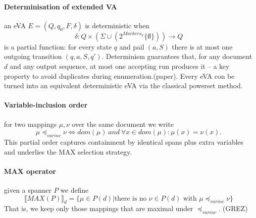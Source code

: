 \paragraph{Determinisation of extended VA} an eVA $E = (Q, q_0, F, \delta)$ is deterministic when
$$
\delta : Q \times (\Sigma \cup (2^{Markers_V}\{\emptyset\}))\rightarrow Q
$$
is a partial function: for every state $q$ and pail $(a,S)$ there is at most one outgoing transition $(q,a,S,q')$. Determinism guarantees that, for any document $d$ and any output sequence, at most one accepting run produces it – a key property to avoid duplicates during enumeration.(paper).
Every eVA con be turned into an equivalent deterministic eVA via the classical powerset method.

\paragraph{Variable-inclusion order} for two mappings $\mu, \nu$ over the same document we write
$$
\mu \preccurlyeq_{var inc } \nu \Longleftrightarrow dom(\mu) \ and \ \forall x \in dom(\mu): \mu(x) = \nu(x).
$$
This partial order captures containment by identical spans plus extra variables and underlies the MAX selection strategy.

\paragraph{MAX operator} given a spanner $P$ we define
$$
\llbracket MAX(P)\rrbracket_d = \{ \mu \in P(d) | \text{there is no } \nu \in P(d) \text{ with } \mu \preccurlyeq_{var inc } \nu \}
$$
That is, we keep only those mappings that are maximal under $\preccurlyeq_{var inc }$. (GREZ) 
  